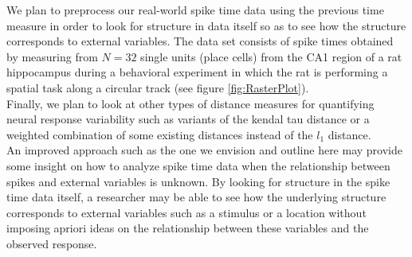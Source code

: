 We plan to preprocess  our real-world spike time  data  using the previous time measure  in order to look for
structure in data itself so as to see how the structure corresponds to external variables. The  data set consists of spike times
obtained by measuring from $N = 32$ single units (place cells)  from the CA1 region of a rat hippocampus during a behavioral experiment in which the rat is performing a spatial task along a circular track (see figure \ref{fig:RasterPlot}).\\

Finally, we plan to look at other types of distance measures for quantifying neural response variability such as variants of the kendal tau distance  or a weighted combination of some existing distances instead of the $l_1$ distance.\\

An improved approach such as the one we envision and outline here  may provide some insight on how to analyze
spike time data when the relationship between spikes and external variables is unknown.  By looking for structure in the 
spike time data itself,  a researcher may be able to see how the underlying structure corresponds to external variables such as a stimulus  or a location without imposing apriori ideas  on the relationship between these variables and the observed response.















